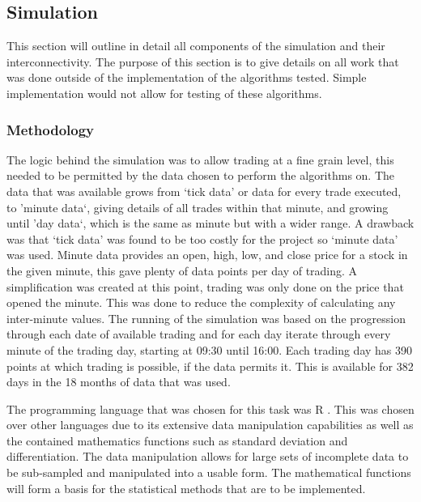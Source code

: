 \documentclass[conference]{IEEEtran}
\begin{document}

\subsection{Simulation}

This section will outline in detail all components of the simulation and their interconnectivity. The purpose of this section is to give details on all work that was done outside of the implementation of the algorithms tested. Simple implementation would not allow for testing of these algorithms. \\

\subsubsection{Methodology}

The logic behind the simulation was to allow trading at a fine grain level, this needed to be permitted by the data chosen to perform the algorithms on. The data that was available grows from `tick data' or data for every trade executed, to 'minute data`, giving details of all trades within that minute, and growing until 'day data`, which is the same as minute but with a wider range. A drawback was that `tick data' was found to be too costly for the project so `minute data' was used. Minute data provides an open, high, low, and close price for a stock in the given minute, this gave plenty of data points per day of trading. A simplification was created at this point, trading was only done on the price that opened the minute. This was done to reduce the complexity of calculating any inter-minute values. The running of the simulation was based on the progression through each date of available trading and for each day iterate through every minute of the trading day, starting at 09:30 until 16:00. Each trading day has 390 points at which trading is possible, if the data permits it. This is available for 382 days in the 18 months of data that was used. 

The programming language that was chosen for this task was R \cite{Team2013}. This was chosen over other languages due to its extensive data manipulation capabilities as well as the contained mathematics functions such as standard deviation and differentiation. The data manipulation allows for large sets of incomplete data to be sub-sampled and manipulated into a usable form. The mathematical functions will form a basis for the statistical methods that are to be implemented.
\end{document}
